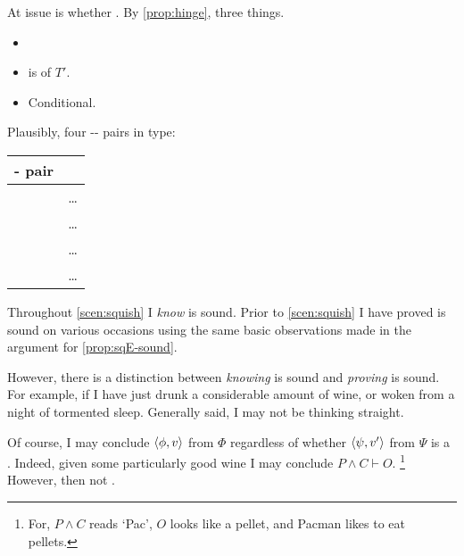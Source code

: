 \begin{note}

  At issue is whether \requ{}.
  By \autoref{prop:hinge}, three things.
  \begin{itemize}
  \item
    \tRep{}
  \item
    \sqE{} is \tI{} of \(T'\).
  \item
    Conditional.
  \end{itemize}

  Plausibly, four -- pairs in type:

  \begin{center}
    \begin{tabular}{R{.45\textwidth} L{.45\textwidth}}
      - pair &  \\
      \hline
       & \dots \\
       & \dots \\
       & \dots \\
       & \dots \\
    \end{tabular}
  \end{center}

  Throughout \autoref{scen:squish} I \emph{know} \sqE{} is sound.
  Prior to \autoref{scen:squish} I have proved \sqE{} is sound on various occasions using the same basic observations made in the argument for \autoref{prop:sqE-sound}.

  However, there is a distinction between \emph{knowing} \sqE{} is sound and \emph{proving} \sqE{} is sound.
  For example, if I have just drunk a considerable amount of wine, or woken from a night of tormented sleep.
  Generally said, I may not be thinking straight.

  Of course, I may conclude \(\langle \phi, v \rangle\) from \(\Phi\) regardless of whether \(\langle \psi, v' \rangle\) from \(\Psi\) is a \fc{}.
  Indeed, given some particularly good wine I may conclude \(P \land C \vdash O\).%
  \footnote{
    For, \(P \land C\) reads `Pac', \(O\) looks like a pellet, and Pacman likes to eat pellets.
  }
  However, then not \tCV{}.
\end{note}



